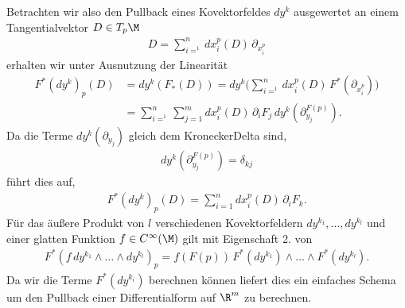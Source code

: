 \documentclass[letterpaper,10pt,english]{jupyterBook}
\begin{document}
\sphinxAtStartPar
Betrachten wir also den Pullback eines Kovektorfeldes \(dy^k\) ausgewertet an einem Tangentialvektor \(D\in T_p\M\)
\begin{equation*}
\begin{split}D = \sum_{i=^1}^n dx_i^p(D)\, \partial_{x_i^p}\end{split}
\end{equation*}
\sphinxAtStartPar
erhalten wir unter Ausnutzung der Linearität
\begin{equation*}
\begin{split}F^\ast(dy^k)_{p}(D) &= dy^k(F_\ast(D)) = 
dy^k\big(\sum_{i=^1}^n dx_i^p(D)\, F^\ast(\partial_{x_i^p})\big)\\
&=
\sum_{i=^1}^n \sum_{j=1}^m dx_i^p(D)\,\partial_i F_j\, dy^k(\partial_{y_j}^{F(p)}).\end{split}
\end{equation*}
\sphinxAtStartPar
Da die Terme \(dy^k(\partial_{y_j})\) gleich dem Kronecker\sphinxhyphen{}Delta sind,
\begin{equation*}
\begin{split}dy^k(\partial_{y_j}^{F(p)}) = \delta_{kj}\end{split}
\end{equation*}
\sphinxAtStartPar
führt dies auf,
\begin{equation*}
\begin{split}F^\ast(dy^k)_{p}(D) =
\sum_{i=1}^n dx_i^p(D)\,\partial_i F_k.\end{split}
\end{equation*}
\sphinxAtStartPar
Für das äußere Produkt von \(l\) verschiedenen Kovektorfeldern \(dy^{k_1},\ldots, dy^{k_l}\) und einer glatten Funktion \(f\in C^\infty(\M)\) gilt mit Eigenschaft 2. von {\hyperref[\detokenize{manifolds/diffformen:lem:pullbackprop}]{}}
\begin{equation*}
\begin{split}F^\ast(f\, dy^{k_1}\wedge\ldots\wedge dy^{k_l})_{p} =
f(F(p))\, F^\ast(dy^{k_1})\wedge\ldots\wedge F^\ast(dy^{k_l}).\end{split}
\end{equation*}
\sphinxAtStartPar
Da wir die Terme \(F^\ast(dy^{k_i})\) berechnen können liefert dies ein einfaches Schema um den Pullback einer Differentialform auf \(\R^m\) zu berechnen.
\label{manifolds/diffformen:example-16}
\end{document}
